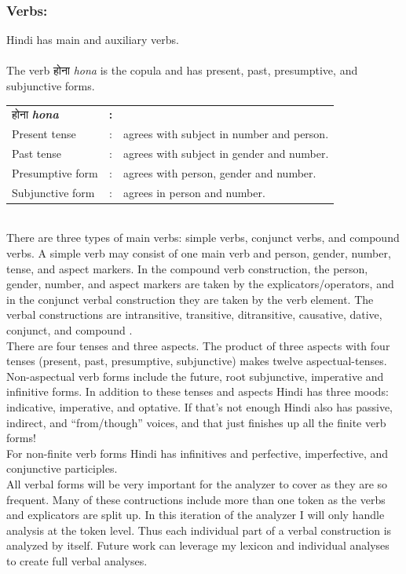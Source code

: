 \documentclass[11pt,letterpaper]{article}
\begin{document}
\subsubsection{Verbs:}
Hindi has main and auxiliary verbs.\\
\\
The verb होना \textit{hona} is the copula and has present, past, presumptive, and subjunctive forms.\\
\begin{tabular}{l c l}
होना \textbf{\textit{hona}} & \textbf{:} &\\
Present tense& : &agrees with subject in number and person.\\
Past tense& : &agrees with subject in gender and number.\\
Presumptive form& : &agrees with person, gender and number.\\
Subjunctive form& : &agrees in person and number.\\
\end{tabular}
\\
There are three types of main verbs: simple verbs, conjunct verbs,
and compound verbs. A simple verb may consist of one main verb
and person, gender, number, tense, and aspect markers. In the
compound verb construction, the person, gender, number, and aspect
markers are taken by the explicators/operators, and in the conjunct
verbal construction they are taken by the verb element. The verbal constructions are intransitive, transitive,
ditransitive, causative, dative, conjunct, and compound \cite{koul}.\\
There are four tenses and three aspects. The product of three aspects with four tenses (present, past, presumptive, subjunctive) makes twelve aspectual-tenses. Non-aspectual verb forms include the future, root subjunctive, imperative and infinitive forms. In addition to these tenses and aspects Hindi has three moods: indicative, imperative, and optative. If that's not enough Hindi also has passive, indirect, and ``from/though'' voices, and that just finishes up all the finite verb forms!\\
For non-finite verb forms Hindi has infinitives and perfective, imperfective, and conjunctive participles.\\
All verbal forms will be very important for the analyzer to cover as they are so frequent. Many of these contructions include more than one token as the verbs and explicators are split up. In this iteration of the analyzer I will only handle analysis at the token level. Thus each individual part of a verbal construction is analyzed by itself. Future work can leverage my lexicon and individual analyses to create full verbal analyses.
\end{document}
